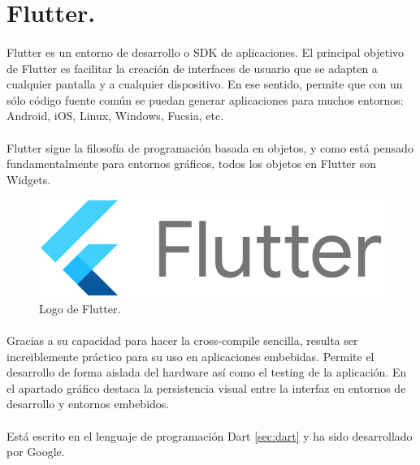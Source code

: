 \section{Flutter.}\label{sec:flutter}

\paragraph{} Flutter es un entorno de desarrollo o \gls{SDK} de aplicaciones. El principal
objetivo de Flutter es facilitar la creación de interfaces de usuario que se adapten a
cualquier pantalla y a cualquier dispositivo. En ese sentido, permite que con un sólo
código fuente común se puedan generar aplicaciones para muchos entornos: Android, iOS,
Linux, Windows, Fucsia, etc.
\cite{flutter}

\paragraph{} Flutter sigue la filosofía de programación basada en objetos, y como está pensado
fundamentalmente para entornos gráficos, todos los objetos en Flutter son \gls{Widgets}.

\begin{figure}[h]
	\centering
	\includegraphics[width=0.50\linewidth]{imgs/flutter-logo}
	\caption[Flutter Logo]{Logo de Flutter.}
	\label{fig:flutter}
\end{figure}

\paragraph{} Gracias a su capacidad para hacer la \gls{cross-compile} sencilla, resulta
ser increiblemente práctico para su uso en aplicaciones embebidas. Permite el desarrollo
de forma aislada del hardware así como el testing de la aplicación. En el apartado
gráfico destaca la persistencia visual entre la interfaz en entornos de desarrollo y
entornos embebidos.

\paragraph{} Está escrito en el lenguaje de programación Dart \ref{sec:dart} y ha sido
desarrollado por Google.

